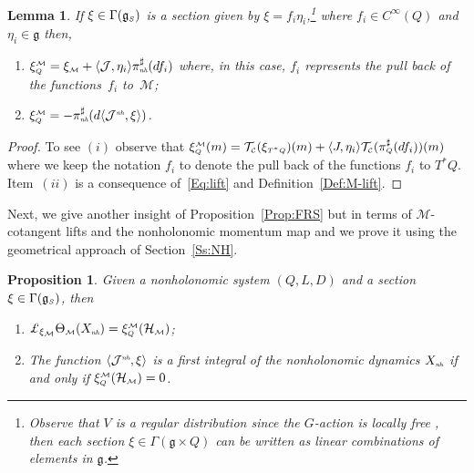 \documentclass[10pt,a4paper]{amsart}
\numberwithin{equation}{section}
\newtheorem{Lemma}[Theorem]{Lemma}
\newtheorem{Proposition}[Theorem]{Proposition}
 { \theoremstyle{definition}
\newtheorem{Definition}[Theorem]{Definition}
\newtheorem{Example}[Theorem]{Example}
\newtheorem{Remark}[Theorem]{Remark}
\newtheorem{Remarks}[Theorem]{Remarks} }
\def\M{\mathcal{M}}
\def\J{\mathcal{J}}
\def\C{\mathcal{C}}
\def\Ham{\mathcal{H}}
\def\g{\mathfrak{g}}
\def\nh{{\mbox{\tiny{nh}}}}
\def\subC{{\mbox{\tiny{$\C$}}}}
\def\subM{{\mbox{\tiny{$\M$}}}}
\def\subSS{{\mbox{\tiny{$S$}}}}
\def\subQQ{{\mbox{\tiny{$Q$}}}}
\begin{document}
\begin{Lemma}\label{L:C-lift}
If $\xi\in\Gamma(\g_\subSS)$ is a section given by $\xi= f_i   \eta_i$,\footnote{Observe that $V$ is a regular distribution since the $G$-action is locally free \cite{Ortega-Ratiu}, then each section $\xi\in \Gamma(\g\times Q)$ can be written as linear combinations of elements in $\g$.} where $f_i \in C^\infty(Q)$ and $\eta_i \in \g$ then,
\begin{enumerate}\itemsep=0pt
 \item[$(i)$] $\xi_\subQQ^\subM = \xi_{\subM}  + \langle \J,\eta_i\rangle   \pi_{\emph\nh}^\sharp(df_i) $ where, in this case, $f_i$ represents the pull back of the func\-tions~$f_i$ to~$\M$;
 \item[$(ii)$] $\xi_\subQQ^\subM  = - \pi_{\emph\nh}^\sharp(d\langle \J^{\emph\nh}, \xi\rangle)$.
\end{enumerate}
\end{Lemma}

\begin{proof} To see $(i)$ observe that $\xi_\subQQ^\subM (m) = {\mathcal T}_\subC(\xi_{\mbox{\tiny{$T^*Q$}}} )(m)   + \langle J,\eta_i\rangle {\mathcal T}_\subC (\pi^\sharp_{\mbox{\tiny{$Q$}}}(df_i) )(m) $ where we keep the notation $f_i$ to denote the pull back of the functions $f_i$ to $T^*Q$.  Item~$(ii)$ is a consequence of~\eqref{Eq:lift} and Def\/inition~\ref{Def:M-lift}.
\end{proof}

Next, we give another insight of Proposition~\ref{Prop:FRS} but in terms of
$\M$-cotangent lifts and the nonholonomic momentum map and we prove
it using the geometrical approach of Section~\ref{Ss:NH}.

\begin{Proposition}\label{Prop:3Conditions}
 Given a nonholonomic system $(Q,L,D)$ and a section $\xi\in \Gamma(\g_\subSS)$, then
 \begin{enumerate}\itemsep=0pt
  \item[$(i)$]  $\pounds_{\xi_\M} \Theta_\subM (X_{\emph\nh})  = \xi_{\mbox{\tiny{$Q$}}}^\subM (\Ham_\subM)$;
 \item[$(ii)$] The function $\langle{\mathcal J}^{\emph\nh}, \xi\rangle$
 is a first integral of the nonholonomic dynamics $X_{\emph\nh}$
 if and only if $\xi_{\mbox{\tiny{$Q$}}}^\subM (\Ham_\subM) = 0$.
 \end{enumerate}
\end{Proposition}
\end{document}
